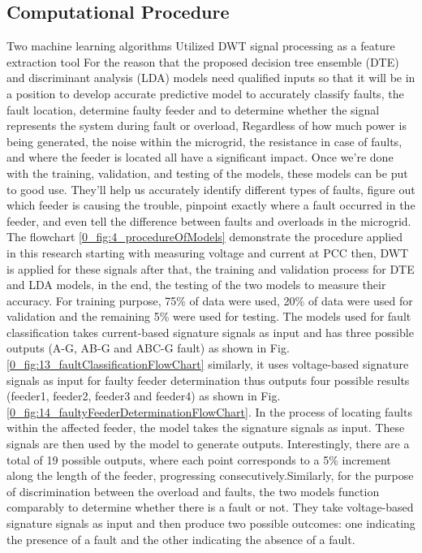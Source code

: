\documentclass[8pt,a4paper,oneside]{elsarticle}
\begin{document}
\subsection{Computational Procedure}
Two machine learning algorithms Utilized DWT signal
processing as a feature extraction tool For the reason that the proposed decision tree ensemble (DTE) and discriminant analysis (LDA) models need qualified inputs so that it will be in a position to develop accurate predictive model to
accurately classify faults, the fault location, determine faulty feeder and to determine whether the signal represents the system during fault or overload,
Regardless of how much power is being generated, the noise within the microgrid, the resistance in case of faults, and where the feeder is located all have a significant impact. Once we're done with the training, validation, and testing of the models, these models can be put to good use. They'll help us accurately identify different types of faults, figure out which feeder is causing the trouble, pinpoint exactly where a fault occurred in the feeder, and even tell the difference between faults and overloads in the microgrid.
The flowchart \ref{0_fig:4_procedureOfModels} demonstrate the procedure applied in this research starting with measuring voltage and current at
PCC then, DWT is applied for these signals after that, the
training and validation process for DTE and LDA models, in the end, the testing of the two models to measure their accuracy.
For training purpose, 75\% of data were used, 20\% of data
were used for validation and the remaining 5\% were used
for testing.
 The models used for fault classification takes current-based signature signals as input
and has three possible outputs (A-G, AB-G and ABC-G fault) as shown in Fig. \ref{0_fig:13_faultClassificationFlowChart} similarly, it uses voltage-based signature signals as input for faulty feeder determination thus outputs four possible results (feeder1, feeder2, feeder3 and feeder4) as shown in Fig. \ref{0_fig:14_faultyFeederDeterminationFlowChart}.
In the process of locating faults within the affected feeder, the model takes the signature signals as input. These signals are then used by the model to generate outputs. Interestingly, there are a total of 19 possible outputs, where each point corresponds to a 5\% increment along the length of the feeder, progressing consecutively.Similarly, for the purpose of discrimination between the overload and faults, the two models function comparably to determine whether there is a fault or not. They take voltage-based signature signals as input and then produce two possible outcomes: one indicating the presence of a fault and the other indicating the absence of a fault.
 
\end{document}
